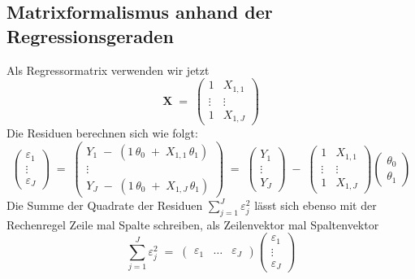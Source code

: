 \subsection{Matrixformalismus anhand der Regressionsgeraden}
Als Regressormatrix verwenden wir jetzt
\begin{equation}
\mathbf{X} \; = \;
\left(
\begin{array}{cc}
1 &  X_{1,1} \\
\vdots & \vdots\\
1 & X_{1,J} 
\end{array}
\right)
\end{equation}
Die Residuen berechnen sich wie folgt: 
\begin{equation}
\left(
\begin{array}{c}
\varepsilon_1\\
\vdots \\
\varepsilon_J
\end{array}
\right)  \; = \;
\left(
\begin{array}{c}
Y_{1} \; - \; (1 \, \theta_0 \; + \;  X_{1,1} \, \theta_1)\\
\vdots \\
Y_{J} \; - \; (1 \, \theta_0 \; + \;  X_{1,J} \, \theta_1)
\end{array}
\right) \; = \;
\left(
\begin{array}{c}
Y_{1}\\
\vdots \\
Y_{J}
\end{array}
\right) 
\; - \; 
\left(
\begin{array}{cc}
1 &  X_{1,1} \\
\vdots & \vdots\\
1 & X_{1,J} 
\end{array}
\right) 
\left(
\begin{array}{c}
\theta_0\\
\theta_1
\end{array}
\right)
\label{linearRegressionGeradeTheta}
\end{equation}
Die Summe der Quadrate der Residuen $\sum_{j=1}^J \varepsilon_j^2$ lässt sich ebenso
mit der Rechenregel Zeile mal Spalte schreiben, als Zeilenvektor mal Spaltenvektor
\begin{equation}
\sum_{j=1}^J \varepsilon_j^2 \; = \; 
\left(\begin{array}{ccc}
\varepsilon_1 & \dots & \varepsilon_J
\end{array}
\right)
\left(
\begin{array}{c}
\varepsilon_1\\
\vdots \\
\varepsilon_J
\end{array}
\right)
\end{equation}
